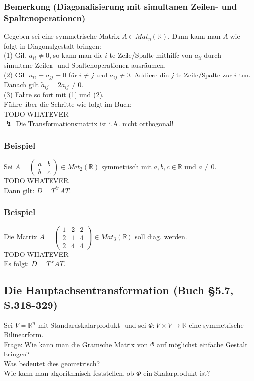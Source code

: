 \documentclass[a4paper]{article}
\newcommand{\ul}{\underline}
\begin{document}
\subsubsection{Bemerkung (Diagonalisierung mit simultanen Zeilen- und Spaltenoperationen)}
Gegeben sei eine symmetrische Matrix \(A\in Mat_n(\mathbb{R})\). Dann kann man \(A\) wie folgt in Diagonalgestalt bringen:\\
(1) Gilt \(a_{ii}\neq 0\), so kann man die \(i\)-te Zeile/Spalte mithilfe von \(a_{ii}\) durch simultane Zeilen- und Spaltenoperationen ausräumen.\\
(2) Gilt \(a_{ii}=a_{jj}=0\) für \(i\neq j\) und \(a_{ij}\neq 0\). Addiere die \(j\)-te Zeile/Spalte zur \(i\)-ten. Danach gilt \(\tilde{a}_{ij}=2a_{ij}\neq 0\).\\
(3) Fahre so fort mit (1) und (2).\\
Führe über die Schritte wie folgt im Buch:\\
TODO WHATEVER\\
\(\lightning\) Die Transformationsmatrix ist i.A. \ul{nicht} orthogonal!
\subsubsection{Beispiel}
Sei \(A=\begin{pmatrix}
a & b\\
b & c
\end{pmatrix}\in Mat_2(\mathbb{R})\) symmetrisch mit \(a,b,c\in\mathbb{R}\) und \(a\neq 0\).\\
TODO WHATEVER\\
Dann gilt: \(D=T^{tr}AT\).
\subsubsection{Beispiel}
Die Matrix \(A=\begin{pmatrix}
1 & 2 & 2\\
2 & 1 & 4\\
2 & 4 & 4
\end{pmatrix}\in Mat_3(\mathbb{R})\) soll diag. werden.\\
TODO WHATEVER\\
Es folgt: \(D=T^{tr}AT\).
\subsection{Die Hauptachsentransformation (Buch §5.7, S.318-329)}
Sei \(V=\mathbb{R}^n\) mit Standardskalarprodukt \(<,>\) und sei \(\Phi:V\times V\rightarrow \mathbb{R}\) eine symmetrische Bilinearform.\\
\ul{Frage:} Wie kann man die Gramsche Matrix von \(\Phi\) auf möglichst einfache Gestalt bringen?\\
Was bedeutet dies geometrisch?\\
Wie kann man algorithmisch feststellen, ob \(\Phi\) ein Skalarprodukt ist?
\end{document}
